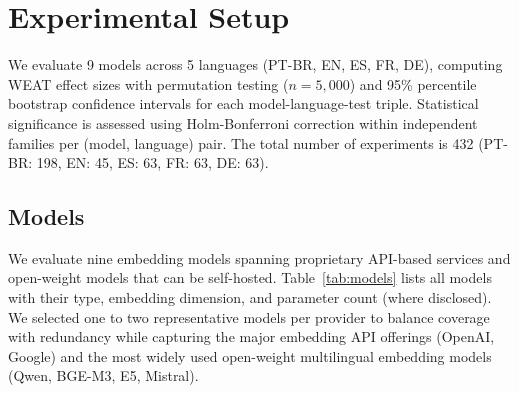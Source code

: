 \documentclass{sbc2019}
\begin{document}
\section{Experimental Setup}

We evaluate 9 models across 5 languages (PT-BR, EN, ES, FR, DE), computing WEAT effect sizes with permutation testing ($n=5{,}000$) and 95\% percentile bootstrap confidence intervals for each model-language-test triple. Statistical significance is assessed using Holm-Bonferroni correction within independent families per (model, language) pair. The total number of experiments is 432 (PT-BR: 198, EN: 45, ES: 63, FR: 63, DE: 63).

\subsection{Models}

We evaluate nine embedding models spanning proprietary API-based services and open-weight models that can be self-hosted. Table~\ref{tab:models} lists all models with their type, embedding dimension, and parameter count (where disclosed). We selected one to two representative models per provider to balance coverage with redundancy while capturing the major embedding API offerings (OpenAI, Google) and the most widely used open-weight multilingual embedding models (Qwen, BGE-M3, E5, Mistral).

\begin{table}[t]
\centering
\caption{Embedding models evaluated in this study.}
\label{tab:models}
\end{table}
\end{document}
